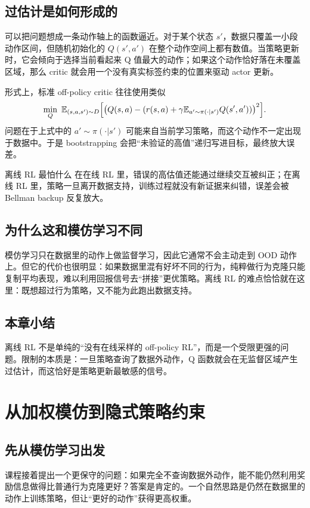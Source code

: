 \documentclass[a4paper]{article}
\begin{document}
\subsection{过估计是如何形成的}
可以把问题想成一条动作轴上的函数逼近。对于某个状态 $s'$，数据只覆盖一小段动作区间，但随机初始化的 $Q(s',a')$ 在整个动作空间上都有数值。当策略更新时，它会倾向于选择当前看起来 Q 值最大的动作；如果这个动作恰好落在未覆盖区域，那么 critic 就会用一个没有真实标签约束的位置来驱动 actor 更新。

形式上，标准 off-policy critic 往往使用类似
\[
\min_Q \ \mathbb{E}_{(s,a,s')\sim D}\Bigl[
\bigl(Q(s,a)- (r(s,a)+\gamma \mathbb{E}_{a'\sim \pi(\cdot|s')}Q(s',a'))\bigr)^2
\Bigr].
\]
问题在于上式中的 $a'\sim\pi(\cdot|s')$ 可能来自当前学习策略，而这个动作不一定出现于数据中。于是 bootstrapping 会把“未验证的高值”递归写进目标，最终放大误差。

\begin{warningbox}{离线 RL 最怕什么}
在在线 RL 里，错误的高估值还能通过继续交互被纠正；在离线 RL 里，策略一旦离开数据支持，训练过程就没有新证据来纠错，误差会被 Bellman backup 反复放大。
\end{warningbox}

\subsection{为什么这和模仿学习不同}
模仿学习只在数据里的动作上做监督学习，因此它通常不会主动走到 OOD 动作上。但它的代价也很明显：如果数据里混有好坏不同的行为，纯粹做行为克隆只能复制平均表现，难以利用回报信号去“拼接”更优策略。离线 RL 的难点恰恰就在这里：既想超过行为策略，又不能为此跑出数据支持。

\subsection{本章小结}
离线 RL 不是单纯的“没有在线采样的 off-policy RL”，而是一个受限更强的问题。限制的本质是：一旦策略查询了数据外动作，Q 函数就会在无监督区域产生过估计，而这恰好是策略更新最敏感的信号。

\section{从加权模仿到隐式策略约束}

\subsection{先从模仿学习出发}
课程接着提出一个更保守的问题：如果完全不查询数据外动作，能不能仍然利用奖励信息做得比普通行为克隆更好？答案是肯定的。一个自然思路是仍然在数据里的动作上训练策略，但让“更好的动作”获得更高权重。
\end{document}
